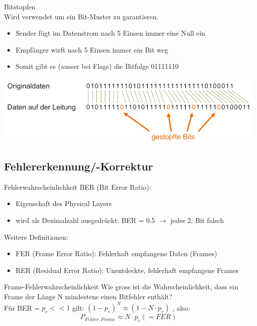 \begin{concept}{Bitstopfen}\\
    Wird verwendet um ein Bit-Muster zu garantieren.
    \begin{itemize}
        \item Sender fügt im Datenstrom nach 5 Einsen immer eine Null ein
        \item Empfänger wirft nach 5 Einsen immer ein Bit weg
        \item Somit gibt es (ausser bei Flags) die Bitfolge 01111110
    \end{itemize}
        \includegraphics[width=0.7\linewidth]{images/bit_stuffing.png}
\end{concept}

\subsection{Fehlererkennung/-Korrektur}

\begin{definition}{Fehlerwahrscheinlichkeit}
    BER (Bit Error Ratio):
    \begin{itemize}
        \item Eigenschaft des Physical Layers
        \item wird als Dezimalzahl ausgedrückt: BER = 0.5 $\rightarrow$ jedes 2. Bit falsch
    \end{itemize}
    Weitere Definitionen:
    \begin{itemize}
        \item FER (Frame Error Ratio): Fehlerhaft empfangene Daten (Frames)
        \item RER (Residual Error Ratio): Unentdeckte, fehlerhaft empfangene Frames
    \end{itemize}
\end{definition}

\begin{KR}{Frame-Fehlerwahrscheinlichkeit}
    Wie gross ist die Wahrscheinlichkeit, dass ein Frame der Länge N mindestens einen Bitfehler enthält?\\
    Für BER = $p_e << 1$ gilt: $(1 - p_e)^N \approx (1 - N \cdot p_e)$ , also: 
    $$P_{Fehler, Frame} \approx N \cdot p_e (=FER)$$
\end{KR}

